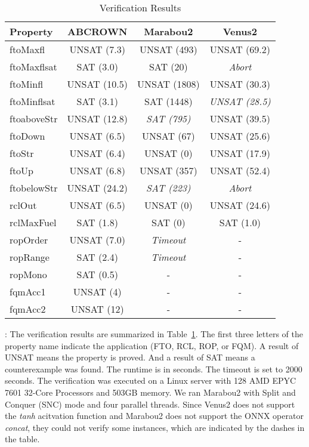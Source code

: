 \begin{table} [htb]
	\centering
  	\caption{Verification Results} \label{tab:results}
	\begin{tabular}{|l | c| c| c|}
		\hline
		Property & ABCROWN  & Marabou2  & Venus2 \\
		\hline
		ftoMaxfl 		& UNSAT (7.3)  	& UNSAT (493) 	& UNSAT (69.2)   \\
		\hline
		ftoMaxflsat 	& SAT (3.0) 		& SAT (20) 		& \emph{Abort} \\
		\hline
		ftoMinfl 		& UNSAT (10.5) 	& UNSAT (1808) 	& UNSAT (30.3)  \\
		\hline
		ftoMinflsat 	& SAT (3.1) 		& SAT (1448) 		& \emph{UNSAT (28.5)} \\
		\hline
		ftoaboveStr 	& UNSAT (12.8) 	&\emph{SAT (795)}		& UNSAT (39.5)\\
		\hline
		ftoDown 		& UNSAT (6.5) 	& UNSAT (67) 		& UNSAT (25.6) \\
		\hline
		ftoStr 	& UNSAT (6.4) 	& UNSAT (0) 		& UNSAT (17.9) \\
		\hline
		ftoUp 			& UNSAT (6.8) 	& UNSAT (357) 	& UNSAT (52.4)  \\
		\hline
		ftobelowStr 	& UNSAT (24.2) 	& \emph{SAT (223)} 		&\emph{Abort} \\
		\hline
		rclOut 	& UNSAT (6.5) 	& UNSAT (0) 		& UNSAT (24.6) \\
		\hline
		rclMaxFuel 	& SAT (1.8) 		& SAT (0) 		& SAT (1.0) \\
		\hline
		ropOrder 		& UNSAT (7.0) 	& \emph{Timeout} 			& - \\
		\hline
		ropRange 		& SAT (2.4) 		& \emph{Timeout} 			& - \\
		\hline
		ropMono 		& SAT (0.5) 		& - 						& - \\
		\hline
		fqmAcc1 		& UNSAT (4) 		& - 						& - \\
		\hline
		fqmAcc2 		& UNSAT (12) 		& - 						& - \\
		\hline
	\end{tabular}
\end{table}

: The verification results are summarized in Table~\ref{tab:results}. The first three letters of the property name indicate the application (FTO, RCL, ROP, or FQM).
A result of UNSAT means the property is proved. And a result of SAT means a counterexample was found. The runtime is in seconds. The timeout is set to 2000 seconds.
The verification was executed on a Linux server with 128 AMD EPYC 7601 32-Core Processors and 503GB memory. We ran Marabou2 with Split and Conquer (SNC) mode and four parallel threads. 
Since Venus2 does not support the \emph{tanh} acitvation function and Marabou2 does not support the ONNX operator \emph{concat}, they could not verify some instances, which are indicated by the dashes in the table.

